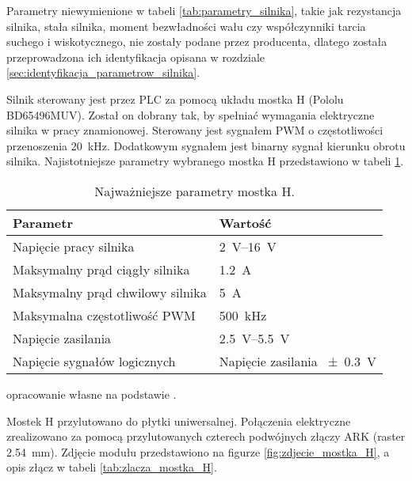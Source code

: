Parametry niewymienione w tabeli \ref{tab:parametry_silnika}, takie jak rezystancja silnika, stała silnika, moment bezwładności wału czy współczynniki tarcia suchego i wiskotycznego, nie zostały podane przez producenta, dlatego została przeprowadzona ich identyfikacja opisana w rozdziale \ref{sec:identyfikacja_parametrow_silnika}.

Silnik sterowany jest przez PLC za pomocą układu mostka H (Pololu BD65496MUV). Został on dobrany tak, by spełniać wymagania elektryczne silnika w pracy znamionowej. Sterowany jest sygnałem PWM o częstotliwości przenoszenia \SI{20}{\kilo\hertz}. Dodatkowym sygnałem jest binarny sygnał kierunku obrotu silnika. Najistotniejsze parametry wybranego mostka H przedstawiono w tabeli \ref{tab:parametry_mostka_H}.

\begin{table}[h]
    \centering
    \begin{threeparttable}
        \caption{Najważniejsze parametry mostka H.}
        \label{tab:parametry_mostka_H}
        
        \begin{tabularx}{0.7\textwidth}{l | l}
            \toprule
            Parametr & Wartość \\
            \midrule
            Napięcie pracy silnika & \SIrange{2}{16}{\volt} \\
            Maksymalny prąd ciągły silnika & \SI{1,2}{\ampere} \\
            Maksymalny prąd chwilowy silnika & \SI{5}{\ampere} \\
            Maksymalna częstotliwość PWM & \SI{500}{\kilo\hertz} \\
            Napięcie zasilania & \SIrange{2,5}{5,5}{\volt} \\
            Napięcie sygnałów logicznych & Napięcie zasilania \SI{+-0,3}{\volt} \\
            \bottomrule
        \end{tabularx}
        
        \begin{tablenotes}
            \footnotesize
            \item[a] opracowanie własne na podstawie \cite{MOSTEK_H_MANUAL}.
        \end{tablenotes}
    \end{threeparttable}
\end{table}

Mostek H przylutowano do płytki uniwersalnej. Połączenia elektryczne zrealizowano za pomocą przylutowanych czterech podwójnych złączy ARK (raster \SI{2,54}{\milli\meter}). Zdjęcie modułu przedstawiono na figurze \ref{fig:zdjecie_mostka_H}, a opis złącz w tabeli \ref{tab:zlacza_mostka_H}.

